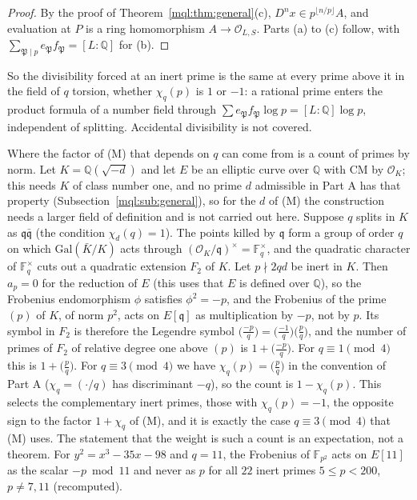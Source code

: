 \begin{proof}
By the proof of Theorem~\ref{mql:thm:general}(c), $D^nx\in p^{\lfloor n/p\rfloor}A$, and evaluation at $P$ is a ring homomorphism $A\to\mathcal O_{L,S}$. Parts (a) to (c) follow, with $\sum_{\mathfrak P\mid p}e_{\mathfrak P}f_{\mathfrak P}=[L:\mathbb Q]$ for (b).
\end{proof}

So the divisibility forced at an inert prime is the same at every prime above it in the field of $q$ torsion, whether $\chi_q(p)$ is $1$ or $-1$: a rational prime enters the product formula of a number field through $\sum e_{\mathfrak P}f_{\mathfrak P}\log p=[L:\mathbb Q]\log p$, independent of splitting. Accidental divisibility is not covered.

\begin{remark}\label{mql:rem:secondweight}
Where the factor of (M) that depends on $q$ can come from is a count of primes by norm. Let $K=\mathbb Q(\sqrt{-d})$ and let $E$ be an elliptic curve over $\mathbb Q$ with CM by $\mathcal O_K$; this needs $K$ of class number one, and no prime $d$ admissible in Part A has that property (Subsection~\ref{mql:sub:general}), so for the $d$ of (M) the construction needs a larger field of definition and is not carried out here. Suppose $q$ splits in $K$ as $\mathfrak q\bar{\mathfrak q}$ (the condition $\chi_d(q)=1$). The points killed by $\mathfrak q$ form a group of order $q$ on which $\mathrm{Gal}(\bar K/K)$ acts through $(\mathcal O_K/\mathfrak q)^\times=\mathbb F_q^\times$, and the quadratic character of $\mathbb F_q^\times$ cuts out a quadratic extension $F_2$ of $K$. Let $p\nmid 2qd$ be inert in $K$. Then $a_p=0$ for the reduction of $E$ (this uses that $E$ is defined over $\mathbb Q$), so the Frobenius endomorphism $\phi$ satisfies $\phi^2=-p$, and the Frobenius of the prime $(p)$ of $K$, of norm $p^2$, acts on $E[\mathfrak q]$ as multiplication by $-p$, not by $p$. Its symbol in $F_2$ is therefore the Legendre symbol $\big(\frac{-p}q\big)=\big(\frac{-1}q\big)\big(\frac pq\big)$, and the number of primes of $F_2$ of relative degree one above $(p)$ is $1+\big(\frac{-p}q\big)$. For $q\equiv1\pmod4$ this is $1+\big(\frac pq\big)$. For $q\equiv3\pmod4$ we have $\chi_q(p)=\big(\frac pq\big)$ in the convention of Part A ($\chi_q=(\cdot/q)$ has discriminant $-q$), so the count is $1-\chi_q(p)$. This selects the complementary inert primes, those with $\chi_q(p)=-1$, the opposite sign to the factor $1+\chi_q$ of (M), and it is exactly the case $q\equiv3\pmod4$ that (M) uses. The statement that the weight is such a count is an expectation, not a theorem. For $y^2=x^3-35x-98$ and $q=11$, the Frobenius of $\mathbb F_{p^2}$ acts on $E[11]$ as the scalar $-p\bmod11$ and never as $p$ for all $22$ inert primes $5\le p<200$, $p\ne7,11$ (recomputed).
\end{remark}

